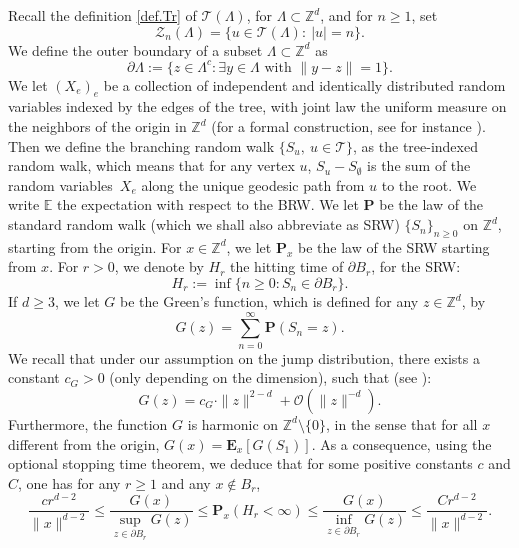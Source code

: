 \documentclass[JEP,XML,SOM,Unicode,NoFloatCountersInSection,published]{cedram}
\theoremstyle{plain}
\theoremstyle{definition}
\newcommand\Z{\mathbb{Z}}
\newcommand\bE{\mathbb{E}}
\newcommand{\1}{{\text{\Large $\mathfrak 1$}}}
\begin{document}
Recall the definition \eqref{def.Tr} of $\mathcal T(\Lambda)$, for $\Lambda\subset
\Z^d$, and for $n\ge 1$, set
\begin{equation}\label{ZnLambda}
\mathcal Z_n(\Lambda)=\{u\in \mathcal T(\Lambda):\ |u|=n\}.
\end{equation}
We define the outer boundary of a subset $\Lambda\subset \mathbb Z^d$ as
\[
\partial \Lambda := \{ z \in \Lambda^c : \exists y\in \Lambda \text{ with }\|y-z\|= 1\}.
\]
We let $(X_e)_e$ be a collection of independent and identically distributed random variables indexed by the edges of the tree, with
joint law the uniform measure on the neighbors of the origin in $\mathbb Z^d$
(for a formal construction, see for instance \cite{Shi}). Then we define the branching random walk $\{S_u,\ u\in \mathbf {\mathcal T}\}$, as the tree-indexed random walk, which means that for
any vertex $u$, $S_u-S_\emptyset$ is the sum of the
random variables~$X_e$ along the unique geodesic path from $u$ to the root.
We write $\bE$ the expectation with respect to the BRW. We let
$\mathbf P$ be the law of the standard random walk (which we shall also abbreviate as SRW) $\{S_n\}_{n\ge 0}$ on $\Z^d$, starting from the origin.
For $x\in \mathbb Z^d$, we let $\mathbf P_x$ be the law of the SRW starting from $x$. For $r > 0$,
we denote by $H_r$ the hitting time
of $\partial B_r$, for the SRW:
\begin{equation}\label{Hr}
H_r:= \inf\{n \ge 0 : S_n \in \partial B_r\}.
\end{equation}
If $d\ge 3$, we let
$G$ be the Green's function, which is defined for any $z\in \mathbb Z^d$, by
\[
G(z) = \sum_{n=0}^\infty \mathbf P(S_n= z).
\]
We recall that under our assumption on the jump distribution, there exists a constant $c_G>0$ (only depending on the dimension), such that (see \cite[Th.\,4.3.1]{LL10}):
\begin{equation}\label{Green}
G(z) = c_G\cdot \|z\|^{2-d} + \mathcal O(\|z\|^{-d}).
\end{equation}
Furthermore, the function $G$ is harmonic on $\mathbb Z^d\setminus \{0\}$, in the sense that for all $x$ different from the origin,
$G(x) = \mathbf E_x[G(S_1)]$. As a consequence, using the optional stopping time theorem, we deduce that for some positive constants
$c$ and $C$, one has for any $r\ge 1$ and any $x\notin B_r$,
\begin{equation}\label{Green2}
\frac{cr^{d-2}}{\|x\|^{d-2}}\le \frac{G(x)}{\sup_{z\in \partial B_r} G(z)}
\le \mathbf P_x(H_r<\infty) \le \frac{G(x)}{\inf_{z\in \partial B_r} G(z)}
\le \frac{Cr^{d-2}}{\|x\|^{d-2}}.
\end{equation}
\end{document}

